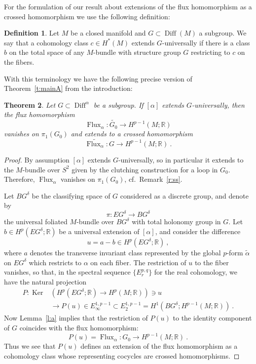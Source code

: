 \documentclass[12pt]{amsart}
\newtheorem{theorem}{Theorem}%
\theoremstyle{definition}
\newtheorem{definition}[theorem]{Definition}
\theoremstyle{remark}
\def\ra{{\rightarrow}}
\def\lra{{\longrightarrow}}
\def\bR{{\mathbb R}}
\newcommand\Flux{\operatorname{Flux}}
\newcommand\Ker{\operatorname{Ker}}
\newcommand\Diff{\operatorname{Diff}}
\begin{document}
For the formulation of our result about extensions of the flux 
homomorphism as a crossed homomorphism we use the following 
definition:
\begin{definition}\label{d:ext}
    Let $M$ be a closed manifold and $G\subset\Diff (M)$ a subgroup. 
    We say that a cohomology class $c\in H^{*}(M)$ extends 
    $G$-universally if there is a class $b$ on the total space 
    of any $M$-bundle with structure group $G$ restricting to $c$ on 
    the fibers.
    \end{definition}
With this terminology we have the following precise version of Theorem~\ref{t:mainA}
from the introduction:
\begin{theorem}\label{t:main}
    Let $G\subset\Diff^{\alpha}$ be a subgroup. If $[\alpha]$ 
    extends $G$-universally, then the flux homomorphism
    $$
    \Flux_{\alpha}\colon \widetilde{G_{0}}\longrightarrow H^{p-1}(M;\bR)
    $$ 
    vanishes on $\pi_{1}(G_{0})$ and extends to a crossed 
    homomorphism 
    $$
    \widetilde{\Flux_{\alpha}}\colon G\longrightarrow H^{p-1}(M;\bR) \ .
    $$
    \end{theorem}
\begin{proof}
By assumption $[\alpha]$ extends $G$-universally, so in particular it 
extends to the $M$-bundle over $S^{2}$ given by the clutching 
construction for a loop in $G_{0}$. Therefore, $\Flux_{\alpha}$ 
vanishes on $\pi_{1}(G_{0})$, cf.~Remark~\ref{r:ss}.
    
Let $BG^{\delta}$ be the classifying space of $G$ 
considered as a discrete group, and denote by 
$$
\pi\colon EG^{\delta}\lra BG^{\delta}
$$
the universal foliated $M$-bundle over $BG^{\delta}$
with total holonomy group in $G$. Let $b\in H^{p}(EG^{\delta};\bR)$ 
be a universal extension of $[\alpha]$, and consider the difference
$$
u=a- b \in H^{p}(EG^{\delta};\bR) \ ,
$$
where $a$ denotes the transverse invariant class represented by
the global $p$-form $\tilde\alpha$ on $EG^{\delta}$ which
restricts to $\alpha$ on each fiber.
The restriction of $u$ to the fiber vanishes, so that,
in the spectral sequence $\{E^{p,q}_r\}$
for the real cohomology, we have the natural projection
\begin{align*}
P\colon\Ker&\left(H^{p}(EG^{\delta};\bR)\ra
H^{p}(M;\bR)\right) \ni u\\
&\lra P(u)\in E_{\infty}^{1,p-1}\subset E_{2}^{1,p-1}= 
H^{1}(BG^{\delta};H^{p-1}(M;\bR)) \ .
\end{align*}
Now Lemma~\ref{l:a} implies that the restriction of $P(u)$ to the 
identity component of $G$ coincides with the flux homomorphism:
\begin{equation*}
P(u)=\Flux_{\alpha}\colon G_{0}\lra H^{p-1}(M;\bR) \ .
\end{equation*}
Thus we see that $P(u)$ defines an extension of the flux homomorphism 
as a cohomology class whose representing cocycles are crossed 
homomorphisms.
\end{proof}
\end{document}
